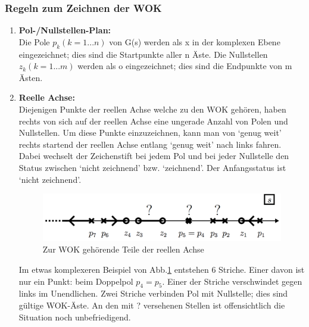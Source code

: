 \subsubsection{Regeln zum Zeichnen der WOK  }
\begin{enumerate}
\item \textbf{Pol-/Nullstellen-Plan:}\\
Die Pole $p_k (k = 1...n)$ von G(s) werden als x in der komplexen Ebene eingezeichnet;
dies sind die Startpunkte aller n Äste. Die Nullstellen $z_k (k = 1...m)$
werden als o eingezeichnet; dies sind die Endpunkte von m Ästen.
\item \textbf{Reelle Achse:}\\
Diejenigen Punkte der reellen Achse welche zu den WOK gehören, haben rechts
von sich auf der reellen Achse eine ungerade Anzahl von Polen und Nullstellen.
Um diese Punkte einzuzeichnen, kann man von ‘genug weit’ rechts startend
der reellen Achse entlang ‘genug weit’ nach links fahren. Dabei wechselt der
Zeichenstift bei jedem Pol und bei jeder Nullstelle den Status zwischen ‘nicht
zeichnend’ bzw. ‘zeichnend’. Der Anfangsstatus ist ‘nicht zeichnend’.
\begin{figure}[h!]
	\begin{center}
		\includegraphics[width=12cm]{./images/reelleAchsePoleNullWOK.png}
	\end{center}
	\caption{Zur WOK gehörende Teile der reellen Achse}
	\label{beispielAchse}
\end{figure}

Im etwas komplexeren Beispiel von Abb.\ref{beispielAchse} entstehen 6 Striche. Einer davon
ist nur ein Punkt: beim Doppelpol $p_4 = p_5$. Einer der Striche verschwindet
gegen links im Unendlichen. Zwei Striche verbinden Pol mit Nullstelle; dies
sind gültige WOK-Äste. An den mit ? versehenen Stellen ist offensichtlich die
Situation noch unbefriedigend.



\end{enumerate}
